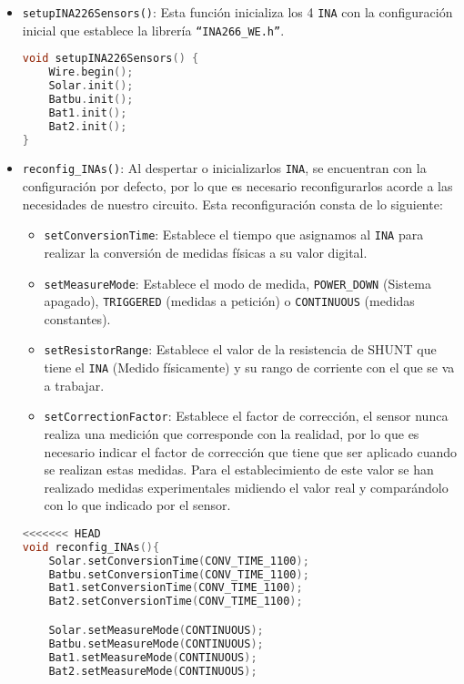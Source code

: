 \begin{itemize}
\item \texttt{setupINA226Sensors()}: Esta función inicializa los 4 \texttt{INA} con la configuración inicial que establece la librería \texttt{“INA266\_WE.h”}.

\begin{lstlisting}[captionpos=b, caption={Codigo función \texttt{setupINA226Sensors}}, language=c++]
void setupINA226Sensors() {
    Wire.begin();
    Solar.init();
    Batbu.init();
    Bat1.init();
    Bat2.init();
}
\end{lstlisting}

\item \texttt{reconfig\_INAs()}: Al despertar o inicializarlos \texttt{INA}, se encuentran con la configuración por defecto, por lo que es necesario reconfigurarlos acorde a las necesidades de nuestro circuito. Esta reconfiguración consta de lo siguiente:
\begin{itemize}
    \item \texttt{setConversionTime}: Establece el tiempo que asignamos al \texttt{INA} para realizar la conversión de medidas físicas a su valor digital.
    \item \texttt{setMeasureMode}: Establece el modo de medida, \texttt{POWER\_DOWN} (Sistema apagado), \texttt{TRIGGERED} (medidas a petición) o \texttt{CONTINUOUS} (medidas constantes).
    \item \texttt{setResistorRange}: Establece el valor de la resistencia de SHUNT que tiene el \texttt{INA} (Medido físicamente) y su rango de corriente con el que se va a trabajar.
    \item \texttt{setCorrectionFactor}: Establece el factor de corrección, el sensor nunca realiza una medición que corresponde con la realidad, por lo que es necesario indicar el factor de corrección que tiene que ser aplicado cuando se realizan estas medidas. Para el establecimiento de este valor se han realizado medidas experimentales midiendo el valor real y comparándolo con lo que indicado por el sensor.
\end{itemize}


\begin{lstlisting}[captionpos=b, caption={Codigo funcion reconfig\_INAs}, language=c++]
<<<<<<< HEAD
void reconfig_INAs(){
    Solar.setConversionTime(CONV_TIME_1100);
    Batbu.setConversionTime(CONV_TIME_1100);
    Bat1.setConversionTime(CONV_TIME_1100);
    Bat2.setConversionTime(CONV_TIME_1100);

    Solar.setMeasureMode(CONTINUOUS);
    Batbu.setMeasureMode(CONTINUOUS);
    Bat1.setMeasureMode(CONTINUOUS);
    Bat2.setMeasureMode(CONTINUOUS);
    

\end{lstlisting}
\end{itemize}
